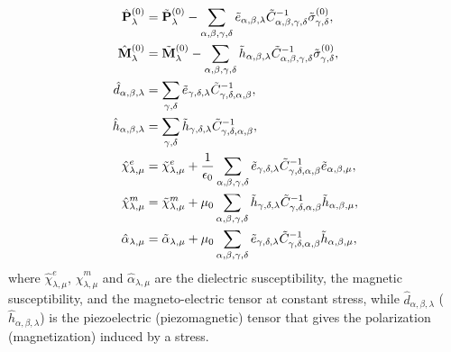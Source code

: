 \documentclass[12pt,a4paper]{article}
\begin{document}
\begin{align}
\hat {\bf P}^{(0)}_{\lambda}&= \tilde {\bf P}^{(0)}_{\lambda}
-\sum_{\alpha,\beta,\gamma,\delta} \tilde e_{\alpha,\beta,\lambda}
\tilde C^{-1}_{\alpha,\beta,\gamma,\delta} 
\tilde \sigma^{(0)}_{\gamma,\delta}, \\
\hat {\bf M}^{(0)}_{\lambda}&= \tilde {\bf M}^{(0)}_{\lambda}
-\sum_{\alpha,\beta,\gamma,\delta} \tilde h_{\alpha,\beta,\lambda}
\tilde C^{-1}_{\alpha,\beta,\gamma,\delta} 
\tilde \sigma^{(0)}_{\gamma,\delta}, \\
\hat d_{\alpha,\beta,\lambda}&= \sum_{\gamma,\delta} 
\tilde e_{\gamma,\delta,\lambda} 
\tilde C^{-1}_{\gamma,\delta,\alpha,\beta}, \\
\hat h_{\alpha,\beta,\lambda}&= \sum_{\gamma,\delta} 
\tilde h_{\gamma,\delta,\lambda} 
\tilde C^{-1}_{\gamma,\delta,\alpha,\beta}, \\
\hat \chi^e_{\lambda,\mu}&= \tilde \chi^e_{\lambda,\mu}
+{1\over \epsilon_0} 
\sum_{\alpha,\beta,\gamma,\delta}\tilde e_{\gamma,\delta,\lambda}
\tilde C^{-1}_{\gamma,\delta,\alpha,\beta} \tilde e_{\alpha,\beta,\mu}, \\
\hat \chi^m_{\lambda,\mu}&= \tilde \chi^m_{\lambda,\mu}
+{\mu_0}\sum_{\alpha,\beta,\gamma,\delta}\tilde h_{\gamma,\delta,\lambda}
\tilde C^{-1}_{\gamma,\delta,\alpha,\beta} \tilde h_{\alpha,\beta,\mu}, \\
\hat \alpha_{\lambda,\mu}&= \tilde \alpha_{\lambda,\mu}
+\mu_0 \sum_{\alpha,\beta,\gamma,\delta}\tilde e_{\gamma,\delta,\lambda}
\tilde C^{-1}_{\gamma,\delta,\alpha,\beta} \tilde h_{\alpha,\beta,\mu},
\end{align}
where $\hat \chi^e_{\lambda,\mu}$, $\hat \chi^m_{\lambda,\mu}$ and
$\hat \alpha_{\lambda,\mu}$ are the dielectric susceptibility, the magnetic
susceptibility, 
and the magneto-electric tensor at constant stress, while 
$\hat d_{\alpha,\beta,\lambda}$ ($\hat h_{\alpha,\beta,\lambda}$)
is the piezoelectric (piezomagnetic) tensor that
gives the polarization (magnetization) induced by a stress. 
\end{document}
